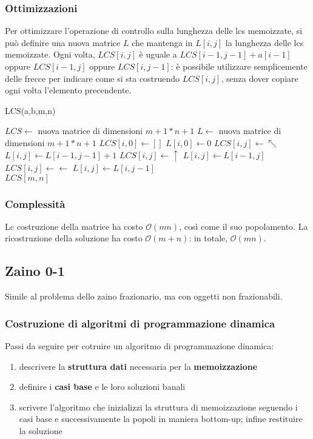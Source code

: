 \documentclass[11pt]{article}
\begin{document}
\subsubsection{Ottimizzazioni}
Per ottimizzare l'operazione di controllo sulla lunghezza delle lcs memoizzate, si può definire una nuova matrice $L$ che 
mantenga in $L[i,j]$ la lunghezza delle lcs memoizzate.
Ogni volta, $LCS[i,j]$ è uguale a $LCS[i-1,j-1]+a[i-1]$ oppure $LCS[i-1,j]$ oppure $LCS[i,j-1]$: è possibile utilizzare 
semplicemente delle frecce per indicare come si sta costruendo $LCS[i,j]$, senza dover copiare ogni volta l'elemento precendente.
\begin{algorithm}
    \caption{LCS(a,b,m,n)}
    \begin{algorithmic}
        \State $LCS\gets$ nuova matrice di dimensioni $m+1*n+1$
        \State $L\gets$ nuova matrice di dimensioni $m+1*n+1$
            \State $LCS[i,0]\gets []$  
            \State $L[i,0]\gets 0$
        \EndFor 
                    \State $LCS[i,j]\gets \nwarrow$
                    \State $L[i,j]\gets L[i-1,j-1]+1$
                    \State $LCS[i,j]\gets \uparrow$
                    \State $L[i,j]\gets L[i-1,j]$
                \Else 
                    \State $LCS[i,j]\gets \leftarrow$
                    \State $L[i,j]\gets L[i,j-1]$
                \EndIf 
            \EndFor 
        \EndFor\\
        \Return $LCS[m,n]$
    \end{algorithmic}
\end{algorithm}
\subsubsection{Complessità}
Lc costruzione della matrice ha costo $\mathcal{O}(mn)$, così come il suo popolamento. La ricostruzione della soluzione 
ha costo $\mathcal{O}(m+n)$: in totale, $\mathcal{O}(mn)$.
\subsection{Zaino 0-1}
Simile al problema dello zaino frazionario, ma con oggetti non frazionabili.
\subsubsection{Costruzione di algoritmi di programmazione dinamica}
Passi da seguire per cotruire un algoritmo di programmazione dinamica:
\begin{enumerate}
    \item descrivere la \textbf{struttura dati} necessaria per la \textbf{memoizzazione}
    \item definire i \textbf{casi base} e le loro soluzioni banali
    \item scrivere l'algoritmo che inizializzi la struttura di memoizzazione seguendo i casi base e successivamente la 
    popoli in maniera bottom-up; infine restituire la soluzione 
\end{enumerate}
\end{document}

